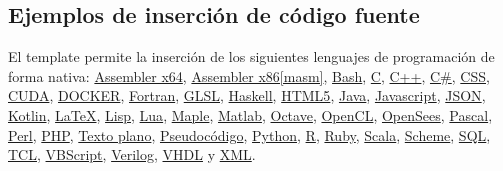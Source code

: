 		\lipsum[4]

		\begin{multicols}{2}

			\lipsum[4]


			\lipsum[2]

		\end{multicols}

	\subsection{Ejemplos de inserción de código fuente}

		\newcommand{\insertsrcmanual}[2]{\href{https://latex.ppizarror.com/informe.html?srctype=#1\#hlp-srccode}{#2}}

		El template permite la inserción de los siguientes lenguajes de programación de forma nativa: \insertsrcmanual{assemblerx64}{Assembler x64}, \insertsrcmanual{assemblerx86}{Assembler x86[masm]},  \insertsrcmanual{bash}{Bash}, \insertsrcmanual{c}{C}, \insertsrcmanual{cpp}{C++}, \insertsrcmanual{csharp}{C\#}, \insertsrcmanual{css}{CSS}, \insertsrcmanual{cuda}{CUDA}, \insertsrcmanual{docker}{DOCKER}, \insertsrcmanual{fortran}{Fortran}, \insertsrcmanual{glsl}{GLSL}, \insertsrcmanual{haskell}{Haskell}, \insertsrcmanual{html5}{HTML5}, \insertsrcmanual{java}{Java}, \insertsrcmanual{js}{Javascript}, \insertsrcmanual{json}{JSON}, \insertsrcmanual{kotlin}{Kotlin}, \insertsrcmanual{latex}{LaTeX}, \insertsrcmanual{lisp}{Lisp}, \insertsrcmanual{lua}{Lua}, \insertsrcmanual{maple}{Maple}, \insertsrcmanual{matlab}{Matlab}, \insertsrcmanual{octave}{Octave}, \insertsrcmanual{opencl}{OpenCL}, \insertsrcmanual{opensees}{OpenSees}, \insertsrcmanual{pascal}{Pascal}, \insertsrcmanual{perl}{Perl}, \insertsrcmanual{php}{PHP}, \insertsrcmanual{plaintext}{Texto plano}, \insertsrcmanual{pseudocode}{Pseudocódigo}, \insertsrcmanual{python}{Python}, \insertsrcmanual{r}{R}, \insertsrcmanual{ruby}{Ruby}, \insertsrcmanual{scala}{Scala}, \insertsrcmanual{scheme}{Scheme}, \insertsrcmanual{sql}{SQL}, \insertsrcmanual{tcl}{TCL}, \insertsrcmanual{vbscript}{VBScript}, \insertsrcmanual{verilog}{Verilog}, \insertsrcmanual{vhdl}{VHDL} y \insertsrcmanual{xml}{XML}. \\
		
